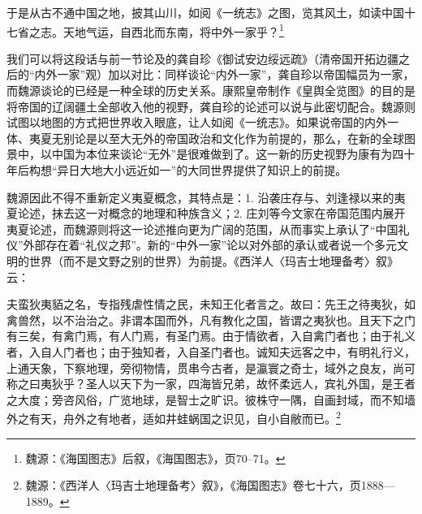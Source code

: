 \documentclass[a4paper, 12pt, openright]{ctexbook}
\renewenvironment{quote}
  {\list{}{\rightmargin2\ccwd \leftmargin2\ccwd \itemindent=2\ccwd \listparindent=2\ccwd}%
   \item\relax\small\kaishu\color{black}}
  {\endlist}
\begin{document}
\begin{quote}
于是从古不通中国之地，披其山川，如阅《一统志》之图，览其风土，如读中国十七省之志。天地气运，自西北而东南，将中外一家乎？\footnote{魏源：《海国图志》后叙，《海国图志》，页70--71。}
\end{quote}

我们可以将这段话与前一节论及的龚自珍《御试安边绥远疏》（清帝国开拓边疆之后的“内外一家”观）加以对比：同样谈论“内外一家”，龚自珍以帝国幅员为一家，而魏源谈论的已经是一种全球的历史关系。康熙皇帝制作《皇舆全览图》的目的是将帝国的辽阔疆土全部收入他的视野，龚自珍的论述可以说与此密切配合。魏源则试图以地图的方式把世界收入眼底，让人如阅《一统志》。如果说帝国的内外一体、夷夏无别论是以至大无外的帝国政治和文化作为前提的，那么，在新的全球图景中，以中国为本位来谈论“无外”是很难做到了。这一新的历史视野为康有为四十年后构想“异日大地大小远近如一”的大同世界提供了知识上的前提。

魏源因此不得不重新定义夷夏概念，其特点是：1. 沿袭庄存与、刘逢禄以来的夷夏论述，抹去这一对概念的地理和种族含义；2. 庄刘等今文家在帝国范围内展开夷夏论述，而魏源则将这一论述推向更为广阔的范围，从而事实上承认了“中国礼仪”外部存在着“礼仪之邦”。新的“中外一家”论以对外部的承认或者说一个多元文明的世界（而不是文野之别的世界）为前提。《西洋人〈玛吉士地理备考〉叙》云：

\begin{quote}
夫蛮狄夷貊之名，专指残虐性情之民，未知王化者言之。故曰：先王之待夷狄，如禽兽然，以不治治之。非谓本国而外，凡有教化之国，皆谓之夷狄也。且天下之门有三矣，有禽门焉，有人门焉，有圣门焉。由于情欲者，入自禽门者也；由于礼义者，入自人门者也；由于独知者，入自圣门者也。诚知夫远客之中，有明礼行义，上通天象，下察地理，旁彻物情，贯串今古者，是瀛寰之奇士，域外之良友，尚可称之曰夷狄乎？圣人以天下为一家，四海皆兄弟，故怀柔远人，宾礼外国，是王者之大度；旁咨风俗，广览地球，是智士之旷识。彼株守一隅，自画封域，而不知墙外之有天，舟外之有地者，适如井蛙蜗国之识见，自小自敝而已。\footnote{魏源：《西洋人〈玛吉士地理备考〉叙》，《海国图志》卷七十六，页1888—1889。}
\end{quote}
\end{document}
